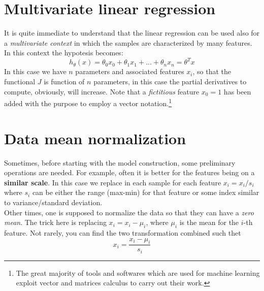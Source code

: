 \section{Multivariate linear regression}
It is quite immediate to understand that the linear regression can be used also for a \textit{multivariate context} in which the samples are characterized by many features. In this context the hypotesis becomes:
\begin{equation}\label{eq:multivariate}
    h_\theta(x) = \theta_0{x_0}+\theta_1{x_1}+...+\theta_n{x_n}=\theta^T{x}
\end{equation}
In this case we have $n$ parameters and associated features $x_i$, so that the functional $J$ is function of $n$ parameters, in this case the partial derivatives to compute, obviously, will increase. Note that a \textit{fictitious} feature $x_0=1$ has been added with the purpose to employ a vector notation.\footnote{
    The great majority of tools and softwares which are used for machine learning exploit vector and matrices calculus to carry out their work.
}\\

\section{Data mean normalization}
Sometimes, before starting with the model construction, some preliminary operations are needed. For example, often it is better for the features being on a \textbf{similar scale}. In this  case we replace in each sample for each feature $x_i=x_i/s_i$ where $s_i$ can be either the range (max-min) for that feature or some index similar to variance/standard deviation.\\
Other times, one is supposed to normalize the data so that they can have a \textit{zero mean}. The trick here is replacing $x_i=x_i-\mu_i$, where $\mu_i$ is the mean for the $i$-th feature. Not rarely, you can find the two transformation combined such thet
\begin{equation}
    x_i=\frac{x_i-\mu_i}{s_i}
\end{equation}

